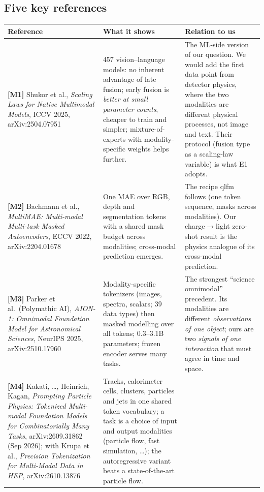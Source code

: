 \documentclass[11pt,a4paper]{article}
\begin{document}
\subsection{Five key references}
\begin{table}[H]\centering\footnotesize
\begin{tabularx}{\textwidth}{>{\raggedright\arraybackslash}p{3.6cm}LL}\toprule
Reference & What it shows & Relation to us\\\midrule
\textbf{[M1]} Shukor et al., \emph{Scaling Laws for Native Multimodal Models}, ICCV 2025, arXiv:2504.07951 &
457 vision--language models: no inherent advantage of late fusion; early fusion is \emph{better at small parameter counts}, cheaper to train and simpler; mixture-of-experts with modality-specific weights helps further. &
The ML-side version of our question. We would add the first data point from detector physics, where the two modalities are different physical processes, not image and text. Their protocol (fusion type as a scaling-law variable) is what E1 adopts.\\\midrule
\textbf{[M2]} Bachmann et al., \emph{MultiMAE: Multi-modal Multi-task Masked Autoencoders}, ECCV 2022, arXiv:2204.01678 &
One MAE over RGB, depth and segmentation tokens with a shared mask budget across modalities; cross-modal prediction emerges. &
The recipe qlfm follows (one token sequence, masks across modalities). Our charge$\to$light zero-shot result is the physics analogue of its cross-modal prediction.\\\midrule
\textbf{[M3]} Parker et al.\ (Polymathic AI), \emph{AION-1: Omnimodal Foundation Model for Astronomical Sciences}, NeurIPS 2025, arXiv:2510.17960 &
Modality-specific tokenizers (images, spectra, scalars; 39 data types) then masked modelling over all tokens; 0.3--3.1B parameters; frozen encoder serves many tasks. &
The strongest ``science omnimodal'' precedent. Its modalities are different \emph{observations of one object}; ours are two \emph{signals of one interaction} that must agree in time and space.\\\midrule
\textbf{[M4]} Kakati, \dots, Heinrich, Kagan, \emph{Prompting Particle Physics: Tokenized Multi-modal Foundation Models for Combinatorially Many Tasks}, arXiv:2609.31862 (Sep 2026); with Krupa et al., \emph{Precision Tokenization for Multi-Modal Data in HEP}, arXiv:2610.13876 &
Tracks, calorimeter cells, clusters, particles and jets in one shared token vocabulary; a task is a choice of input and output modalities (particle flow, fast simulation, \dots); the autoregressive variant beats a state-of-the-art particle flow. &

\end{tabularx}
\end{table}
\end{document}
